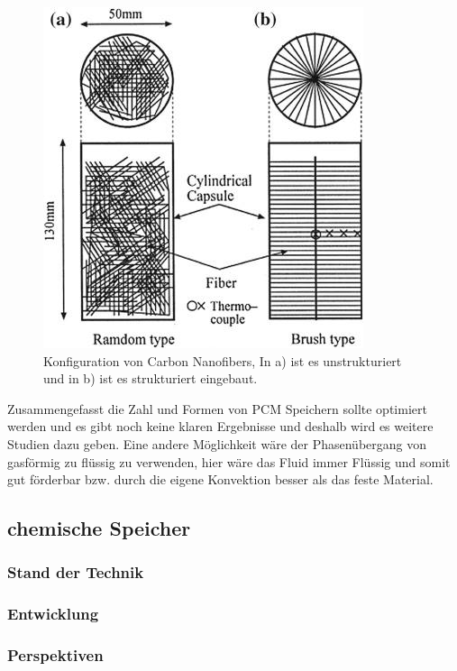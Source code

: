 \documentclass[11pt,a4paper]{scrartcl}
\begin{document}
\begin{figure}[h!]
\begin{center}
\includegraphics[scale=0.6]{images/configurationofthecarbonnanofibers.jpg}
\caption{Konfiguration von Carbon Nanofibers, In a) ist es unstrukturiert und in b) ist es strukturiert eingebaut. \cite{WasteEnergyHarvesting}}
\label{fig:configurationofthecarbonnanofibers}
\end{center}
\end{figure}

Zusammengefasst die Zahl und Formen von PCM Speichern sollte optimiert werden und es gibt noch keine klaren Ergebnisse und deshalb wird es weitere Studien dazu geben.
Eine andere Möglichkeit wäre der Phasenübergang von gasförmig zu flüssig zu verwenden, hier wäre das Fluid immer Flüssig und somit gut förderbar bzw. durch die eigene Konvektion besser als das feste Material.


\subsection{chemische Speicher}
\subsubsection{Stand der Technik}
\subsubsection{Entwicklung}
\subsubsection{Perspektiven}
\end{document}
